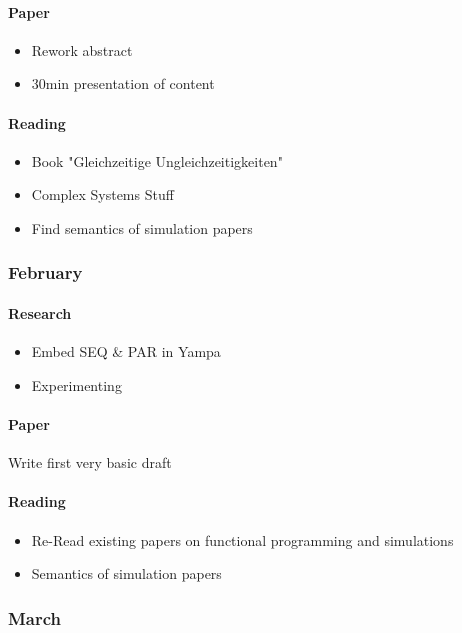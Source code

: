 \paragraph{Paper} 
	\begin{itemize}
		\item Rework abstract 
		\item 30min presentation of content
	\end{itemize}
	
\paragraph{Reading}
	\begin{itemize}
		\item Book "Gleichzeitige Ungleichzeitigkeiten"
		\item Complex Systems Stuff
		\item Find semantics of simulation papers
	\end{itemize}
	
\subsubsection{February}
\paragraph{Research}
	\begin{itemize}
		\item Embed SEQ \& PAR in Yampa
		\item Experimenting
	\end{itemize}
	
\paragraph{Paper} Write first very basic draft
	
\paragraph{Reading}
	\begin{itemize}
		\item Re-Read existing papers on functional programming and simulations 
		\item Semantics of simulation papers
	\end{itemize}
	
\subsubsection{March}
